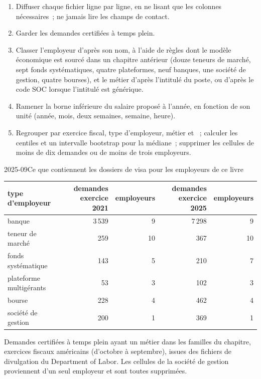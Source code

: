 \begin{method}\label{met:in:pay-levels-by-role-firm-type-and-seniority:lca}
\begin{enumerate}
\item Diffuser chaque fichier ligne par ligne, en ne lisant que les colonnes nécessaires~; ne jamais lire les champs de contact.
\item Garder les demandes certifiées à temps plein.
\item Classer l'employeur d'après son nom, à l'aide de règles dont le modèle économique est sourcé dans un chapitre antérieur (douze teneurs de marché, sept fonds systématiques, quatre plateformes,
neuf banques, une société de gestion, quatre bourses), et le métier d'après l'intitulé du poste,
ou d'après le code SOC lorsque l'intitulé est générique.
\item Ramener la borne inférieure du salaire proposé à l'année, en fonction de son unité (année, mois, deux semaines, semaine, heure).
\item Regrouper par exercice fiscal, type d'employeur, métier et ~; calculer les centiles et un intervalle bootstrap pour la
médiane~; supprimer les cellules de moins de dix demandes ou de moins de trois employeurs.
\end{enumerate}
\end{method}

\begin{dated}{2025-09}{Ce que contiennent les dossiers de visa pour les employeurs de ce livre}\label{dat:in:pay-levels-by-role-firm-type-and-seniority:counts}
\footnotesize
\begin{tabular}{@{}lrrrr@{}}
\toprule
type d'employeur & demandes exercice 2021 & employeurs & demandes exercice 2025 & employeurs\\
\midrule
banque & 3\,539 & 9 & 7\,298 & 9\\
teneur de marché & 259 & 10 & 367 & 10\\
fonds systématique & 143 & 5 & 210 & 7\\
plateforme multigérants & 53 & 3 & 102 & 3\\
bourse & 228 & 4 & 462 & 4\\
société de gestion & 200 & 1 & 369 & 1\\
\bottomrule
\end{tabular}

\smallskip\noindent Demandes certifiées à temps plein ayant un métier dans les familles du chapitre, exercices fiscaux américains (d'octobre à
septembre), issues des fichiers de divulgation du Department of Labor. Les cellules de la société de gestion proviennent d'un seul employeur et sont
toutes supprimées.
\end{dated}

